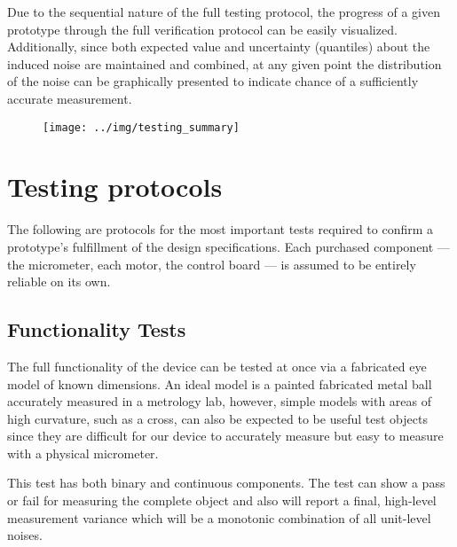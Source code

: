 \documentclass{article}
\begin{document}
Due to the sequential nature of the full testing protocol, the progress of a given prototype through the full verification protocol can be easily visualized. Additionally, since both expected value and uncertainty (quantiles) about the induced noise are maintained and combined, at any given point the distribution of the noise can be graphically presented to indicate chance of a sufficiently accurate measurement.

\begin{figure}[H]
  \centering
  \texttt{[image: ../img/testing\_summary]}
  \label{fig:summary}
\end{figure}

\section{Testing protocols}
\label{sec:protocols}

The following are protocols for the most important tests required to confirm a prototype's fulfillment of the design specifications. Each purchased component --- the micrometer, each motor, the control board --- is assumed to be entirely reliable on its own. 

\subsection{Functionality Tests}
\label{sec:functional-tests}

The full functionality of the device can be tested at once via a fabricated eye model of known dimensions. An ideal model is a painted fabricated metal ball accurately measured in a metrology lab, however, simple models with areas of high curvature, such as a cross, can also be expected to be useful test objects since they are difficult for our device to accurately measure but easy to measure with a physical micrometer.

This test has both binary and continuous components. The test can show a pass or fail for measuring the complete object and also will report a final, high-level measurement variance which will be a monotonic combination of all unit-level noises.
\end{document}
